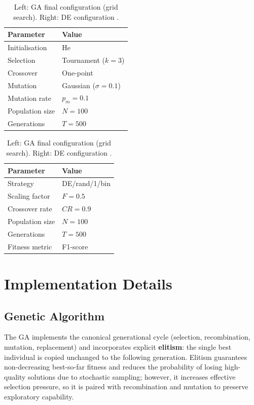 \documentclass[12pt, a4paper]{article}
\newcommand{\rowhead}{\rowcolor{primary}\color{white}\bfseries}
\begin{document}
\begin{table}[H]
\centering
\renewcommand{\arraystretch}{1.3}
\begin{tabular}{ll}
\toprule
\rowhead Parameter & \multicolumn{1}{l}{\color{white}Value} \\
\midrule
Initialisation  & He \cite{he2015} \\
Selection       & Tournament ($k=3$) \\
Crossover       & One-point \\
Mutation        & Gaussian ($\sigma=0.1$) \\
Mutation rate   & $p_m = 0.1$ \\
Population size & $N = 100$ \\
Generations     & $T = 500$ \\
\bottomrule
\end{tabular}
\quad
\begin{tabular}{ll}
\toprule
\rowhead Parameter & \multicolumn{1}{l}{\color{white}Value} \\
\midrule
Strategy        & DE/rand/1/bin \\
Scaling factor  & $F = 0.5$ \\
Crossover rate  & $CR = 0.9$ \\
Population size & $N = 100$ \\
Generations     & $T = 500$ \\
Fitness metric  & F1-score \\
\bottomrule
\end{tabular}
\caption{Left: GA final configuration (grid search). Right: DE configuration \cite{storn1997}.}
\label{tab:params}
\end{table}

\section{Implementation Details}

\subsection{Genetic Algorithm}

The GA implements the canonical generational cycle (selection, recombination, mutation, replacement) and incorporates explicit \textbf{elitism}: the single best individual is copied unchanged to the following generation. Elitism guarantees non-decreasing best-so-far fitness and reduces the probability of losing high-quality solutions due to stochastic sampling; however, it increases effective selection pressure, so it is paired with recombination and mutation to preserve exploratory capability.
\end{document}
